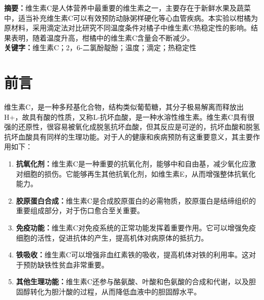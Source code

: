 \documentclass[12pt,hyperref,a4paper,UTF8]{ctexart}
\begin{document}
\cover

%
%

\thispagestyle{empty} %

\newpage
\tableofcontents

\newpage


\noindent \textbf{摘要：}维生素C是人体营养中最重要的维生素之一，主要存在于新鲜水果及蔬菜中，适当补充维生素C可以有效预防动脉粥样硬化等心血管疾病。本实验以柑橘为原材料，采用滴定法对比研究不同温度条件对橘子中维生素C热稳定性的影响。结果表明，随着温度升高，柑橘中的维生素C含量会不断减少。\\

\textbf{关键字：}维生素C；2，6-二氯酚靛酚；温度；滴定；热稳定性
\section{前言}
维生素C，是一种多羟基化合物，结构类似葡萄糖，其分子极易解离而释放出H+，故具有酸的性质，又称L-抗坏血酸，是一种水溶性维生素。维生素C具有很强的还原性，很容易被氧化成脱氢抗坏血酸，但其反应是可逆的，抗坏血酸和脱氢抗坏血酸具有同样的生理功能\cite{3}。对于人的健康和疾病预防有这重要意义，其主要作用如下\cite{1}：
\begin{enumerate}
	\item \textbf{抗氧化剂：}维生素C是一种重要的抗氧化剂，能够中和自由基，减少氧化应激对细胞的损伤。它能够再生其他抗氧化剂，如维生素E，从而增强整体抗氧化能力。
	\item \textbf{胶原蛋白合成：}维生素C是合成胶原蛋白的必需物质，胶原蛋白是结缔组织的重要组成部分，对于伤口愈合至关重要。
	\item \textbf{免疫功能：}维生素C对免疫系统的正常功能发挥着重要作用。它可以增强免疫细胞的活性，促进抗体的产生，提高机体对病原体的抵抗力。
	\item \textbf{铁吸收：}维生素C可以增强非血红素铁的吸收，提高机体对铁的利用率。这对于预防缺铁性贫血非常重要。
	\item \textbf{其他生理功能：}维生素C还参与酪氨酸、叶酸和色氨酸的合成和代谢，以及胆固醇转化为胆汁酸的过程，从而降低血液中的胆固醇水平。
\end{enumerate}
\end{document}
